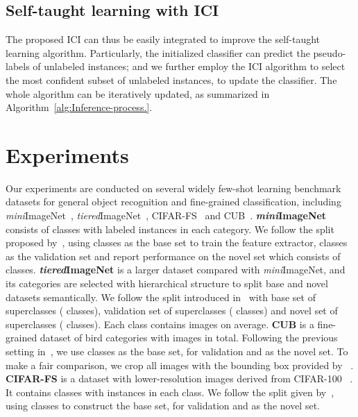 \documentclass[10pt,letterpaper,twocolumn]{article}
\newcommand{\mypar}[1]{\smallskip\noindent {\bf #1}\enskip}
\begin{document}
\subsection{Self-taught learning with ICI}

The proposed ICI can thus be easily integrated to improve the self-taught learning algorithm. Particularly, the initialized classifier can predict the pseudo-labels of unlabeled instances; and we further employ the ICI algorithm to select the most confident subset of unlabeled instances, to update the classifier. The whole algorithm can be iteratively updated, as summarized in Algorithm~\ref{alg:Inference-process.}. 



\section{Experiments}


\mypar{Datasets.}
Our experiments are conducted on several widely few-shot learning benchmark datasets for general object recognition and fine-grained classification, including
\emph{mini}ImageNet~\cite{ravi2016optimization}, \emph{tiered}ImageNet~\cite{ren2018meta}, 
CIFAR-FS~\cite{bertinetto2018metalearning} and 
CUB~\cite{wah2011caltech}.
\textbf{\emph{mini}}\textbf{ImageNet} consists of  classes with  labeled instances in each category.
We follow the split proposed by~\cite{ravi2016optimization}, using  classes as the base set to train the feature extractor,  classes as the validation set and 
report performance on the novel set which consists of  classes. 
\textbf{\emph{tiered}}\textbf{ImageNet} is a larger dataset compared with \emph{mini}ImageNet, and its categories are selected with hierarchical structure to split base and novel datasets semantically. 
We follow the split introduced in~\cite{ren2018meta} with base set of  superclasses ( classes), validation set of  superclasses ( classes) and novel set of  superclasses ( classes). 
Each class contains  images on average. 
\textbf{CUB} is a fine-grained dataset of  bird categories with  images in total. 
Following the previous setting in~\cite{hilliard2018few}, we use  classes as the base set,  for validation and  as the novel set. 
To make a fair comparison, we crop all images with the bounding box provided by ~\cite{triantafillou2017few}.
\textbf{CIFAR-FS} is a dataset with lower-resolution images derived from CIFAR-100~\cite{krizhevsky2009learning} .
It contains  classes with  instances in each class. 
We follow the split given by~\cite{bertinetto2018metalearning}, using  classes to construct the base set,  for validation and  as the novel set.
\end{document}

